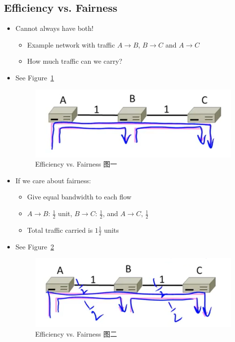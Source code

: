 \documentclass[12pt]{ctexart}   %
\begin{document}
	\subsection{Efficiency vs. Fairness}
	\begin{itemize}
		\item Cannot always have both!
		\begin{itemize}
			\item Example network with traffic $A \rightarrow B$, $B \rightarrow C$ and $A \rightarrow C$
			\item How much traffic can we carry?
		\end{itemize}
		\item See Figure~\ref{fig:7-2-1}
		  
		 \begin{figure}[h!] %
		\centering
		 \includegraphics[scale=0.7]{images/7-2-1}
		\caption{ Efficiency vs. Fairness 图一}
		 \label{fig:7-2-1}
		 \end{figure}
		 
		 \item If we care about fairness:
		 \begin{itemize}
		 	\item Give equal bandwidth to each flow
		 	\item $A \rightarrow B$: $\frac{1}{2}$ unit, $B \rightarrow C$: $\frac{1}{2}$, and $A \rightarrow C$, $\frac{1}{2}$
		 	\item Total traffic carried is $1 \frac{1}{2}$ units
		 \end{itemize}
		 \item See Figure~\ref{fig:7-2-2}
		  
		 \begin{figure}[h!] %
		\centering
		 \includegraphics[scale=0.7]{images/7-2-2}
		\caption{ Efficiency vs. Fairness 图二}
		 \label{fig:7-2-2}
		 \end{figure}
		 

\end{itemize}
\end{document}
